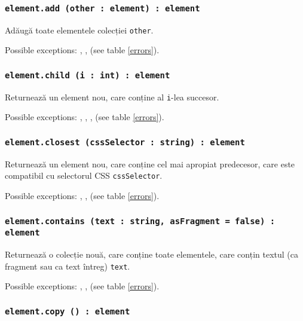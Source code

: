 \subsubsection{\texttt{element.add (other : element) : element}}

Adăugă toate elementele colecției \texttt{other}.

Possible exceptions: , ,  (see table \ref{errors}).

\subsubsection{\texttt{element.child (i : int) : element}}

Returnează un element nou, care conține al \texttt{i}-lea succesor.

Possible exceptions: , , ,  (see table \ref{errors}).

\subsubsection{\texttt{element.closest (cssSelector : string) : element}}

Returnează un element nou, care conține cel mai apropiat predecesor, care este compatibil cu selectorul CSS \texttt{cssSelector}.

Possible exceptions: , ,  (see table \ref{errors}).

\subsubsection{\texttt{element.contains (text : string, asFragment = false) : element}}

Returnează o colecție nouă, care conține toate elementele, care conțin textul (ca fragment sau ca text întreg) \texttt{text}.

Possible exceptions: , ,  (see table \ref{errors}).

\subsubsection{\texttt{element.copy () : element}}

